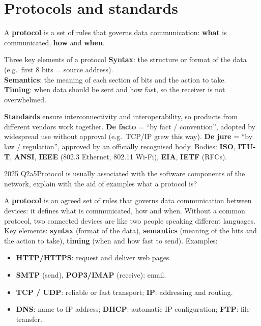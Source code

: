 \documentclass[10pt]{article}
\begin{document}
\section{Protocols and standards}

A \textbf{protocol} is a set of rules that governs data communication: \textbf{what} is communicated, \textbf{how} and \textbf{when}.
\begin{keydef}{Three key elements of a protocol}
\textbf{Syntax}: the structure or format of the data (e.g.\ first 8 bits = source address).\\
\textbf{Semantics}: the meaning of each section of bits and the action to take.\\
\textbf{Timing}: when data should be sent and how fast, so the receiver is not overwhelmed.
\end{keydef}

\textbf{Standards} ensure interconnectivity and interoperability, so products from different vendors work together.
\textbf{De facto} = ``by fact / convention'', adopted by widespread use without approval (e.g.\ TCP/IP grew this way).
\textbf{De jure} = ``by law / regulation'', approved by an officially recognised body.
Bodies: \textbf{ISO}, \textbf{ITU-T}, \textbf{ANSI}, \textbf{IEEE} (802.3 Ethernet, 802.11 Wi-Fi), \textbf{EIA}, \textbf{IETF} (RFCs).

\begin{pastq}{2025 Q2a}{5}Protocol is usually associated with the software components of the network, explain with the aid of examples what a protocol is?\end{pastq}
\begin{ans}
A \textbf{protocol} is an agreed set of rules that governs data communication between devices: it defines what is communicated, how and when. Without a common protocol, two connected devices are like two people speaking different languages.
Key elements: \textbf{syntax} (format of the data), \textbf{semantics} (meaning of the bits and the action to take), \textbf{timing} (when and how fast to send).
Examples:
\begin{itemize}
\item \textbf{HTTP/HTTPS}: request and deliver web pages.
\item \textbf{SMTP} (send), \textbf{POP3/IMAP} (receive): email.
\item \textbf{TCP / UDP}: reliable or fast transport; \textbf{IP}: addressing and routing.
\item \textbf{DNS}: name to IP address; \textbf{DHCP}: automatic IP configuration; \textbf{FTP}: file transfer.
\end{itemize}
\end{ans}
\end{document}
